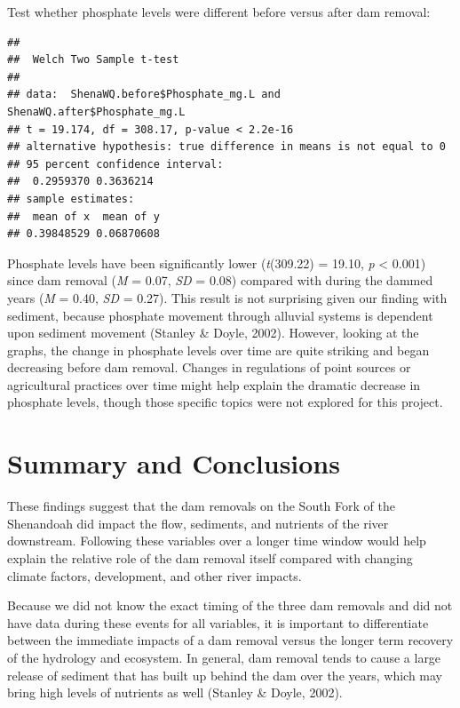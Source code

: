 \documentclass[
  12pt,
]{article}
\begin{document}
Test whether phosphate levels were different before versus after dam
removal:

\begin{verbatim}
## 
##  Welch Two Sample t-test
## 
## data:  ShenaWQ.before$Phosphate_mg.L and ShenaWQ.after$Phosphate_mg.L
## t = 19.174, df = 308.17, p-value < 2.2e-16
## alternative hypothesis: true difference in means is not equal to 0
## 95 percent confidence interval:
##  0.2959370 0.3636214
## sample estimates:
##  mean of x  mean of y 
## 0.39848529 0.06870608
\end{verbatim}

Phosphate levels have been significantly lower (\emph{t}(309.22) =
19.10, \emph{p} \textless{} 0.001) since dam removal (\emph{M} = 0.07,
\emph{SD} = 0.08) compared with during the dammed years (\emph{M} =
0.40, \emph{SD} = 0.27). This result is not surprising given our finding
with sediment, because phosphate movement through alluvial systems is
dependent upon sediment movement (Stanley \& Doyle, 2002). However,
looking at the graphs, the change in phosphate levels over time are
quite striking and began decreasing before dam removal. Changes in
regulations of point sources or agricultural practices over time might
help explain the dramatic decrease in phosphate levels, though those
specific topics were not explored for this project.

\newpage

\hypertarget{summary-and-conclusions}{%
\section{Summary and Conclusions}\label{summary-and-conclusions}}

These findings suggest that the dam removals on the South Fork of the
Shenandoah did impact the flow, sediments, and nutrients of the river
downstream. Following these variables over a longer time window would
help explain the relative role of the dam removal itself compared with
changing climate factors, development, and other river impacts.

Because we did not know the exact timing of the three dam removals and
did not have data during these events for all variables, it is important
to differentiate between the immediate impacts of a dam removal versus
the longer term recovery of the hydrology and ecosystem. In general, dam
removal tends to cause a large release of sediment that has built up
behind the dam over the years, which may bring high levels of nutrients
as well (Stanley \& Doyle, 2002).
\end{document}
